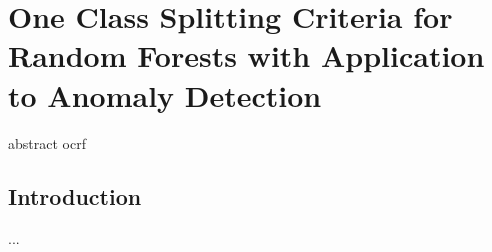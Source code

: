 \chapter{One Class Splitting Criteria for Random Forests with Application to Anomaly Detection}
\label{chap:ocrf}
\begin{chapabstract}
abstract ocrf
\end{chapabstract}



\section{Introduction}
...